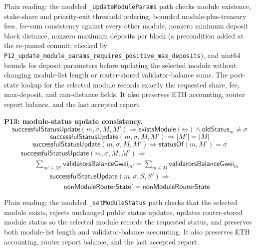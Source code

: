 \noindent Plain reading: the modeled \texttt{\_updateModuleParams} path checks
module existence, stake-share and priority-exit threshold ordering, bounded
module-plus-treasury fees, fee-sum consistency against every other module,
nonzero minimum deposit block distance, nonzero maximum deposits per block
(a precondition added at the re-pinned commit; checked by
\texttt{P12\_update\_module\_params\_requires\_positive\_max\_deposits}), and
uint64 bounds for deposit parameters
before updating the selected module without changing module-list length or
router-stored validator-balance sums. The post-state lookup for the selected
module records exactly the requested share, fee, max-deposit, and min-distance
fields. It also preserves ETH accounting, router report balance, and the last
accepted report.

\medskip
\noindent\textbf{P13: module-status update consistency.}
\[
  \mathsf{successfulStatusUpdate}(m,\sigma,M,M')
  \Rightarrow
  \mathsf{existsModule}(m)
  \land
  \mathsf{oldStatus}_m \neq \sigma
\]
\[
  \mathsf{successfulStatusUpdate}(m,\sigma,M,M')
  \Rightarrow
  |M'|=|M|
\]
\[
  \mathsf{successfulStatusUpdate}(m,\sigma,M,M')
  \Rightarrow
  \mathsf{statusOf}(m,M')=\sigma
\]
\[
  \begin{array}{l}
  \mathsf{successfulStatusUpdate}(m,\sigma,M,M')
  \Rightarrow \\
  \qquad
  \sum_{m'\in M'} \mathsf{validatorsBalanceGwei}_{m'}
  =
  \sum_{m\in M} \mathsf{validatorsBalanceGwei}_m
  \end{array}
\]
\[
  \begin{array}{l}
  \mathsf{successfulStatusUpdate}(m,\sigma,S,S')
  \Rightarrow \\
  \qquad
  \mathsf{nonModuleRouterState}' = \mathsf{nonModuleRouterState}
  \end{array}
\]

\noindent Plain reading: the modeled \texttt{\_setModuleStatus} path checks
that the selected module exists, rejects unchanged public status updates, updates
router-stored module status so the selected module records the requested
status, and preserves both module-list length and validator-balance accounting.
It also preserves ETH accounting, router report balance, and the last accepted
report.

